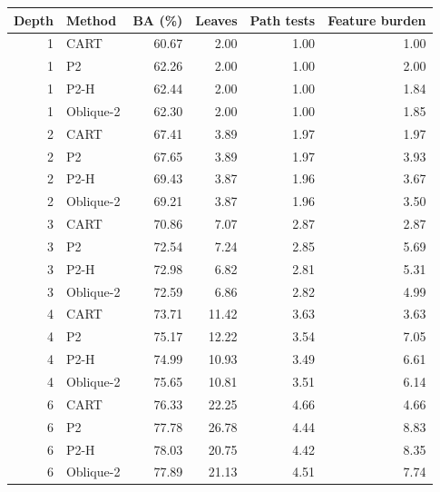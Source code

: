 \begin{tabular}{rlrrrr}
\toprule
Depth & Method & BA (\%) & Leaves & Path tests & Feature burden \\
\midrule
1 & CART & 60.67 & 2.00 & 1.00 & 1.00 \\
1 & P2 & 62.26 & 2.00 & 1.00 & 2.00 \\
1 & P2-H & 62.44 & 2.00 & 1.00 & 1.84 \\
1 & Oblique-2 & 62.30 & 2.00 & 1.00 & 1.85 \\
2 & CART & 67.41 & 3.89 & 1.97 & 1.97 \\
2 & P2 & 67.65 & 3.89 & 1.97 & 3.93 \\
2 & P2-H & 69.43 & 3.87 & 1.96 & 3.67 \\
2 & Oblique-2 & 69.21 & 3.87 & 1.96 & 3.50 \\
3 & CART & 70.86 & 7.07 & 2.87 & 2.87 \\
3 & P2 & 72.54 & 7.24 & 2.85 & 5.69 \\
3 & P2-H & 72.98 & 6.82 & 2.81 & 5.31 \\
3 & Oblique-2 & 72.59 & 6.86 & 2.82 & 4.99 \\
4 & CART & 73.71 & 11.42 & 3.63 & 3.63 \\
4 & P2 & 75.17 & 12.22 & 3.54 & 7.05 \\
4 & P2-H & 74.99 & 10.93 & 3.49 & 6.61 \\
4 & Oblique-2 & 75.65 & 10.81 & 3.51 & 6.14 \\
6 & CART & 76.33 & 22.25 & 4.66 & 4.66 \\
6 & P2 & 77.78 & 26.78 & 4.44 & 8.83 \\
6 & P2-H & 78.03 & 20.75 & 4.42 & 8.35 \\
6 & Oblique-2 & 77.89 & 21.13 & 4.51 & 7.74 \\
\bottomrule
\end{tabular}
